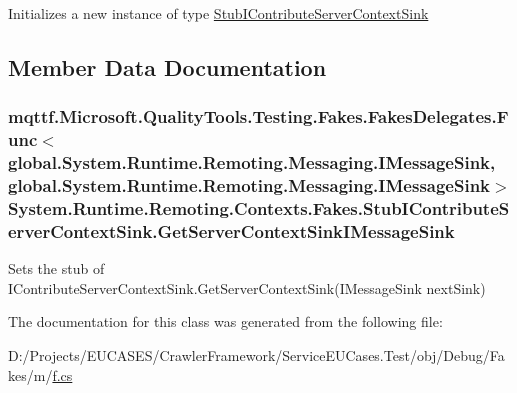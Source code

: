 Initializes a new instance of type \hyperlink{class_system_1_1_runtime_1_1_remoting_1_1_contexts_1_1_fakes_1_1_stub_i_contribute_server_context_sink}{Stub\-I\-Contribute\-Server\-Context\-Sink}



\subsection{Member Data Documentation}
\hypertarget{class_system_1_1_runtime_1_1_remoting_1_1_contexts_1_1_fakes_1_1_stub_i_contribute_server_context_sink_a6bb0f7a44833b91e4900c4bfafeb7bf5}{
\subsubsection[{Get\-Server\-Context\-Sink\-I\-Message\-Sink}]{\setlength{\rightskip}{0pt plus 5cm}mqttf.\-Microsoft.\-Quality\-Tools.\-Testing.\-Fakes.\-Fakes\-Delegates.\-Func$<$global.\-System.\-Runtime.\-Remoting.\-Messaging.\-I\-Message\-Sink, global.\-System.\-Runtime.\-Remoting.\-Messaging.\-I\-Message\-Sink$>$ System.\-Runtime.\-Remoting.\-Contexts.\-Fakes.\-Stub\-I\-Contribute\-Server\-Context\-Sink.\-Get\-Server\-Context\-Sink\-I\-Message\-Sink}}\label{class_system_1_1_runtime_1_1_remoting_1_1_contexts_1_1_fakes_1_1_stub_i_contribute_server_context_sink_a6bb0f7a44833b91e4900c4bfafeb7bf5}


Sets the stub of I\-Contribute\-Server\-Context\-Sink.\-Get\-Server\-Context\-Sink(\-I\-Message\-Sink next\-Sink)



The documentation for this class was generated from the following file\-:\begin{DoxyCompactItemize}
\item 
D\-:/\-Projects/\-E\-U\-C\-A\-S\-E\-S/\-Crawler\-Framework/\-Service\-E\-U\-Cases.\-Test/obj/\-Debug/\-Fakes/m/\hyperlink{m_2f_8cs}{f.\-cs}\end{DoxyCompactItemize}

